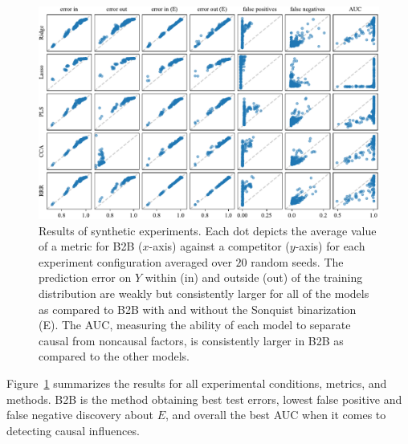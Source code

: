 \begin{figure}[htpb] \centering
\includegraphics[width=\textwidth]{synthetic.pdf} \caption{Results of synthetic
experiments. Each dot depicts the average value of a metric for B2B ($x$-axis)
against a competitor ($y$-axis) for each experiment configuration averaged over
$20$ random seeds. The prediction error on $Y$ within (in) and outside (out) of
the training distribution are weakly but consistently larger for all of the
models as compared to B2B with and without the Sonquist binarization (E). The
AUC, measuring the ability of each model to separate causal from noncausal
factors, is consistently larger in B2B as compared to the other models.}
\label{table:synthetic} \end{figure} \fi

Figure~\ref{table:synthetic} summarizes the results for all experimental
conditions, metrics, and methods.
%
B2B is the method obtaining best test errors, lowest false positive and false
negative discovery about $E$, and overall the best AUC when it comes to
detecting causal influences.
